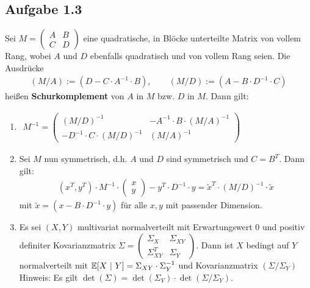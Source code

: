 \subsection{Aufgabe 1.3}
Sei 
$M=\begin{pmatrix}
	A & B\\ C & D
\end{pmatrix}$ eine quadratische, in Blöcke unterteilte Matrix von vollem Rang, wobei $A$ und $D$ ebenfalls quadratisch und von vollem Rang seien. 
Die Ausdrücke
\begin{align*}
	(M/A):=\left(D-C\cdot A^{-1}\cdot B\right),\qquad(M/D):=\left(A-B\cdot D^{-1}\cdot C\right)
\end{align*}
heißen \textbf{Schurkomplement} von $A$ in $M$ bzw. 
$D$ in $M$. Dann gilt:
\begin{enumerate}[label=\alph*)]
	\item $\begin{aligned}
		M^{-1}=\begin{pmatrix}
			(M/D)^{-1} & -A^{-1}\cdot B\cdot(M/A)^{-1}\\
			-D^{-1}\cdot C\cdot(M/D)^{-1} & (M/A)^{-1}
		\end{pmatrix}
	\end{aligned}$
	\item Sei $M$ nun symmetrisch, d.h. $A$ und $D$ sind symmetrisch und $C=B^T$. Dann gilt:
	\begin{align*}
		(x^T,y^T)\cdot M^{-1}\cdot\begin{pmatrix}
			x\\y
		\end{pmatrix}-y^T\cdot D^{-1}\cdot y=\tilde{x}^T\cdot(M/D)^{-1}\cdot\tilde{x}
	\end{align*}
	mit $\tilde{x}=\left(x-B\cdot D^{-1}\cdot y\right)$ für alle $x,y$ mit passender Dimension.
	\item Es sei $(X,Y)$ multivariat normalverteilt mit Erwartungswert 0 und positiv definiter Kovarianzmatrix 
	$\Sigma=\begin{pmatrix}
		\Sigma_X & \Sigma_{XY}\\ 
		\Sigma_{XY}^T & \Sigma_Y
	\end{pmatrix}$. 
	Dann ist $X$ bedingt auf $Y$ normalverteilt mit $\mathbb{E}[X~|~Y]=\Sigma_{XY}\cdot\Sigma_{Y}^{-1}$ und Kovarianzmatrix $(\Sigma/\Sigma_Y)$\\
	Hinweis: Es gilt $\det(\Sigma)=\det(\Sigma_Y)\cdot\det(\Sigma/\Sigma_Y)$.
\end{enumerate}

